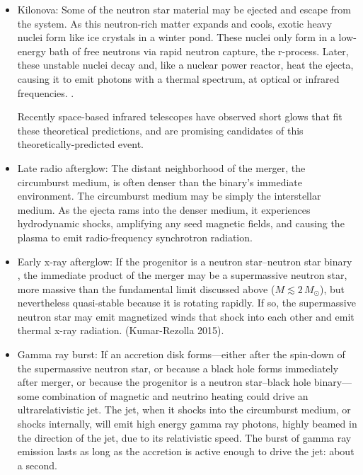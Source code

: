 \begin{itemize}
  \item Kilonova: Some of the neutron star material may be ejected and escape
    from the system. As this neutron-rich matter expands and cools, exotic heavy
    nuclei form like ice crystals in a winter pond. These nuclei only form in a
    low-energy bath of free neutrons via rapid neutron capture, the r-process.
    Later, these unstable nuclei decay and, like a nuclear power reactor,
    heat the ejecta, causing it to emit photons with a
    thermal spectrum, at optical or infrared frequencies.
    \citep{
      li1998-transients,
      robe2011-transients,
      metz2012-most_promising,
      kase2013-opacities}.

    Recently space-based infrared telescopes have observed short glows that
    fit these theoretical predictions, and are promising candidates of this
    theoretically-predicted event.
  \item Late radio afterglow: The distant neighborhood of the merger, the
    circumburst medium, is often denser than the binary's immediate environment.
    The circumburst medium may be simply the interstellar medium.
    As the ejecta rams into the denser medium, it experiences hydrodynamic
    shocks, amplifying any seed magnetic fields, and causing the plasma to
    emit radio-frequency synchrotron radiation.
  \item Early x-ray afterglow: If the progenitor is a neutron star--neutron
    star binary \nsns, the immediate product of the merger may be
    a supermassive neutron star,
    more massive than the fundamental
    limit discussed above ($M\lesssim2\,M_\odot$), but nevertheless quasi-stable
    because it is rotating rapidly.
    If so, the supermassive neutron star may emit magnetized winds that shock
    into each other and emit thermal x-ray radiation. (Kumar-Rezolla 2015).
  \item Gamma ray burst: If an accretion disk forms---either after the
    spin-down of the supermassive neutron star, or because a black hole forms
    immediately after merger, or because the progenitor is a neutron star--black
    hole \nsbh binary---some combination of magnetic and neutrino heating
    could drive an ultrarelativistic jet. The jet, when it shocks into the
    circumburst medium, or shocks internally, will emit high energy gamma ray
    photons, highly beamed in the direction of the jet, due to its relativistic
    speed. The burst of gamma ray emission lasts as long as the accretion is
    active enough to drive the jet: about a second.


\end{itemize}
